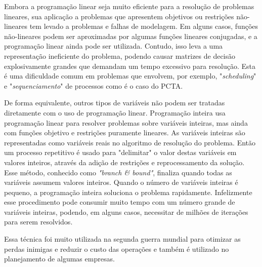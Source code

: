 Embora a programação linear seja muito eficiente para a resolução de problemas
lineares, sua aplicação a problemas que apresentem objetivos ou restrições
não-lineares tem levado a problemas e falhas de modelagem. Em alguns casos,
funções não-lineares podem ser aproximadas por algumas funções lineares
conjugadas, e a programação linear ainda pode ser utilizada. Contudo, isso leva
a uma representação ineficiente do problema, podendo causar matrizes de decisão
explosivamente grandes que demandam um tempo excessivo para resolução. Esta é
uma dificuldade comum em problemas que envolvem, por exemplo,
"\textit{scheduling}" e "\textit{sequenciamento}" de processos como é o caso do
PCTA.

De forma equivalente, outros tipos de variáveis não podem ser tratadas
diretamente com o uso de programação linear. Programação inteira usa
programação linear para resolver problemas sobre variáveis inteiras, mas ainda
com funções objetivo e restrições puramente lineares. As variáveis inteiras são
representadas como variáveis reais no algoritmo de resolução do problema. Então
um processo repetitivo é usado para "delimitar" o valor destas variáveis em
valores inteiros, através da adição de restrições e reprocessamento da solução.
Esse método, conhecido como \textit{"branch \& bound"}, finaliza quando todas
as variáveis assumem valores inteiros. Quando o número de variáveis inteiras é
pequeno, a programação inteira soluciona o problema rapidamente. Infelizmente
esse procedimento pode consumir muito tempo com um número grande de variáveis
inteiras, podendo, em alguns casos, necessitar de milhões de iterações para
serem resolvidos.
 	
Essa técnica foi muito utilizada na segunda guerra mundial para otimizar as
perdas inimigas e reduzir o custo das operações e também é utilizado no
planejamento de algumas empresas.

